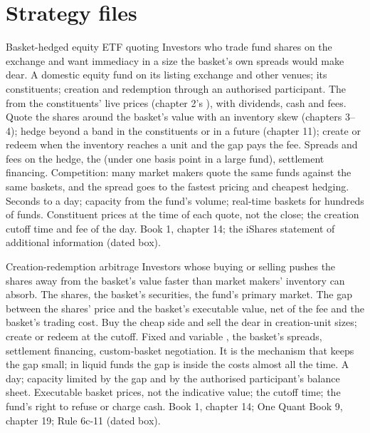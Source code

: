\section{Strategy files}

\begin{strategyfile}{Basket-hedged equity ETF quoting}\label{strat:hf:etf-market-making:equity}
 Investors who trade fund shares on the exchange and want immediacy in a size the basket's own spreads would make dear.
 A domestic equity fund on its listing exchange and other venues; its constituents; creation and redemption through an
authorised participant.
 The  from the constituents' live prices (chapter 2's ), with dividends, cash and fees.
 Quote the shares around the basket's value with an inventory skew (chapters 3--4); hedge beyond a band in the
constituents or in a future (chapter 11); create or redeem when the inventory reaches a unit and the gap pays the fee.
 Spreads and fees on the hedge, the  (under one basis point in a large fund), settlement financing.
 Competition: many market makers quote the same funds against the same baskets, and the spread goes to the fastest pricing and
cheapest hedging.
 Seconds to a day; capacity from the fund's volume; real-time baskets for hundreds of funds.
 Constituent prices at the time of each quote, not the close; the creation cutoff time and fee of the day.
 Book 1, chapter 14; the iShares statement of additional information (dated box).
\end{strategyfile}

\begin{strategyfile}{Creation-redemption arbitrage}\label{strat:hf:etf-market-making:createredeem}
 Investors whose buying or selling pushes the shares away from the basket's value faster than market makers' inventory
can absorb.
 The shares, the basket's securities, the fund's primary market.
 The gap between the shares' price and the basket's executable value, net of the fee and the basket's trading cost.
 Buy the cheap side and sell the dear in creation-unit sizes; create or redeem at the cutoff.
 Fixed and variable , the basket's spreads, settlement financing, custom-basket negotiation.
 It is the mechanism that keeps the gap small; in liquid funds the gap is inside the costs almost all the time.
 A day; capacity limited by the gap and by the authorised participant's balance sheet.
 Executable basket prices, not the indicative value; the cutoff time; the fund's right to refuse or charge cash.
 Book 1, chapter 14; One Quant Book 9, chapter 19; Rule 6c-11 (dated box).
\end{strategyfile}

